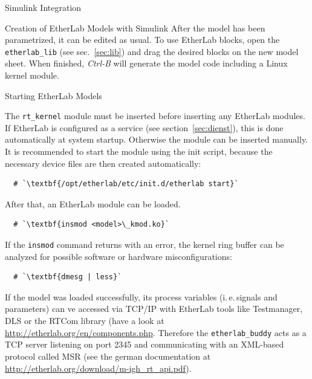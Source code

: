 \begin{ighsec}{Simulink Integration}
\begin{ighsec}{Creation of EtherLab Models with Simulink}
After the model has been parametrized, it can be edited as usual. To use
EtherLab blocks, open the \texttt{etherlab\_lib} (see sec.~\ref{sec:lib})
and drag the desired blocks on the new model sheet. When finished,
\textit{Ctrl-B} will generate the model code including a Linux kernel module.

\end{ighsec}


\end{ighsec} %


\begin{ighsec}{Starting EtherLab Models}
\label{sec:start}

The \texttt{rt\_kernel} module must be inserted before inserting any EtherLab
modules. If EtherLab is configured as a service (see
section~\ref{sec:dienst}), this is done automatically at system startup.
Otherwise the module can be inserted manually. It is recommended to start the
module using the init script, because the necessary device files are then
created automatically:

\begin{lstlisting}
  # `\textbf{/opt/etherlab/etc/init.d/etherlab start}`
\end{lstlisting}

After that, an EtherLab module can be loaded.

\begin{lstlisting}
  # `\textbf{insmod <model>\_kmod.ko}`
\end{lstlisting}

If the \texttt{insmod} command returns with an error, the kernel ring
buffer can be analyzed for possible software or hardware
misconfigurations:

\begin{lstlisting}
  # `\textbf{dmesg | less}`
\end{lstlisting}

If the model was loaded successfully, its process variables (i.\,e.\,signals
and parameters) can ve accessed via TCP/IP with EtherLab tools like
Testmanager, DLS or the RTCom library (have a look at
\url{http://etherlab.org/en/components.php}. Therefore the
\texttt{etherlab\_buddy} acts as a TCP server listening on port 2345 and
communicating with an XML-based protocol called MSR (see the german
documentation at \url{http://etherlab.org/download/m-igh_rt_api.pdf}).

\end{ighsec}

